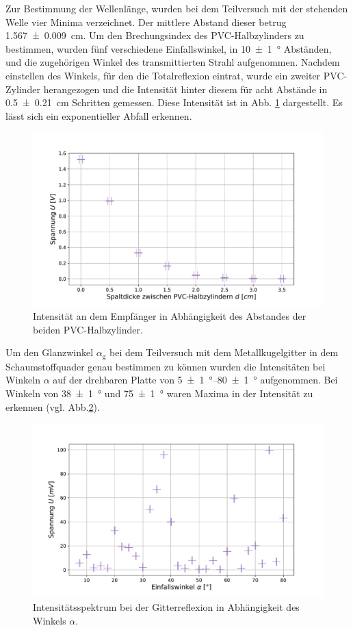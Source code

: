 		Zur Bestimmung der Wellenlänge, wurden bei dem Teilversuch mit der stehenden Welle vier Minima verzeichnet.
		Der mittlere Abstand dieser betrug \SI{1,567+-0,009}{\centi\meter}.
		Um den Brechungsindex des PVC-Halbzylinders zu bestimmen, wurden fünf verschiedene Einfallswinkel, in \SI{10+-1}{\degree} Abständen, und die zugehörigen Winkel des transmittierten Strahl aufgenommen.
		Nachdem einstellen des Winkels, für den die Totalreflexion eintrat, wurde ein zweiter PVC-Zylinder herangezogen und die Intensität hinter diesem für acht Abstände in \SI{0,5+-0,21}{\centi\meter} Schritten gemessen.
		Diese Intensität ist in Abb. \ref{fig:totalreflexion} dargestellt.
		Es lässt sich ein exponentieller Abfall erkennen.
		\begin{figure}[ht]
			\centering
			\includegraphics[width=\textwidth]{data/totalreflektion.pdf}
			\caption{Intensität an dem Empfänger in Abhängigkeit des Abstandes der beiden PVC-Halbzylinder.}
			\label{fig:totalreflexion}	
		\end{figure}
		Um den Glanzwinkel $\alpha_\text{g}$ bei dem Teilversuch mit dem Metallkugelgitter in dem Schaumstoffquader genau bestimmen zu können wurden die Intensitäten bei Winkeln $\alpha$ auf der drehbaren Platte von \SIrange{5+-1}{80+-1}{\degree} aufgenommen.
		Bei Winkeln von \SI{38+-1}{\degree} und \SI{75+-1}{\degree} waren Maxima in der Intensität zu erkennen (vgl. Abb.\ref{fig:braggwinkel}).
		\begin{figure}[ht]
			\centering
			\includegraphics[width=\textwidth]{data/schaumstoff.pdf}
			\caption{Intensitätsspektrum bei der Gitterreflexion in Abhängigkeit des Winkels $\alpha$.}
			\label{fig:braggwinkel}	
		\end{figure}

